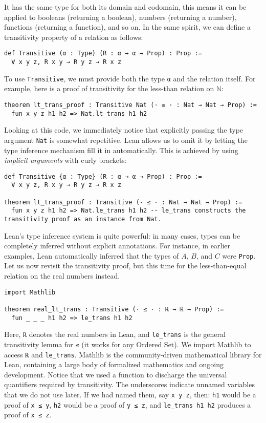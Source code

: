 It has the same type for 
both its domain and codomain, this means it can be 
applied to booleans (returning a boolean), numbers (returning a number), 
functions (returning a function), and so on.
In the same spirit, we can define a transitivity property of a relation as follows:
\begin{lstlisting}[language=lean]
def Transitive (α : Type) (R : α → α → Prop) : Prop :=
  ∀ x y z, R x y → R y z → R x z
\end{lstlisting}
To use \lstinline[language=lean]|Transitive|, we must provide both the type \lstinline[language=lean]|α| and the relation itself. For example, here is a proof of transitivity for the less-than relation on $\mathbb{N}$:
\begin{lstlisting}[language=lean]
theorem lt_trans_proof : Transitive Nat (· ≤ · : Nat → Nat → Prop) :=
  fun x y z h1 h2 => Nat.lt_trans h1 h2
\end{lstlisting}
Looking at this code, we immediately notice that explicitly 
passing the type argument \lstinline[language=lean]|Nat| is somewhat repetitive. 
Lean allows us to omit it by letting the type inference mechanism fill it in automatically.
 This is achieved by using \emph{implicit arguments} with curly brackets:
\begin{lstlisting}[language=lean]
def Transitive {α : Type} (R : α → α → Prop) : Prop :=
  ∀ x y z, R x y → R y z → R x z

theorem lt_trans_proof : Transitive (· ≤ · : Nat → Nat → Prop) :=
  fun x y z h1 h2 => Nat.le_trans h1 h2 -- le_trans constructs the transitivity proof as an instance from Nat.  
\end{lstlisting}
Lean's type inference system is quite powerful: in many cases, types can be completely 
inferred without explicit annotations. For instance, in earlier examples, Lean automatically 
inferred that the types of $A$, $B$, and $C$ were \lstinline[language=lean]|Prop|.
Let us now revisit the transitivity proof, but this time for the less-than-equal relation on 
the real numbers instead.
\begin{lstlisting}[language=lean]
import Mathlib

theorem real_lt_trans : Transitive (· ≤ · : ℝ → ℝ → Prop) :=
  fun _ _ _ h1 h2 => le_trans h1 h2
\end{lstlisting}
Here, \lstinline[language=lean]|ℝ| denotes the real numbers in Lean, 
and \lstinline[language=lean]|le_trans| is the general transitivity lemma 
for \lstinline[language=lean]|≤| (it works for any Ordered Set). 
We import Mathlib to access \lstinline[language=lean]|ℝ| and \lstinline[language=lean]|le_trans|. Mathlib is the community‑driven mathematical 
library for Lean, containing a large body of formalized mathematics and ongoing development.
Notice that we used a function to discharge the universal 
quantifiers required by transitivity. The underscores indicate 
unnamed variables that we do not use later. If we had named 
them, say \lstinline|x y z|, then:
\lstinline[language=lean]|h1| would be a proof of \lstinline[language=lean]|x ≤ y|,
\lstinline[language=lean]|h2| would be a proof of \lstinline[language=lean]|y ≤ z|,
and \lstinline[language=lean]|le_trans h1 h2| produces a proof of \lstinline[language=lean]|x ≤ z|.

